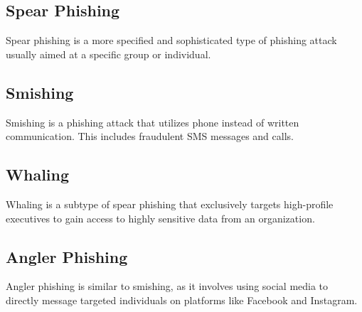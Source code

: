 \documentclass[10pt,twocolumn]{article}
\begin{document}
\subsection{Spear Phishing}
Spear phishing is a more specified and sophisticated type of phishing attack usually aimed at a specific group or individual.

\subsection{Smishing}
Smishing is a phishing attack that utilizes phone instead of written communication. This includes fraudulent SMS messages and calls. 

\subsection{Whaling}
Whaling is a subtype of spear phishing that exclusively targets high-profile executives to gain access to highly sensitive data from an organization. 

\subsection{Angler Phishing}
Angler phishing is similar to smishing, as it involves using social media to directly message targeted individuals on platforms like Facebook and Instagram. 
\end{document}
